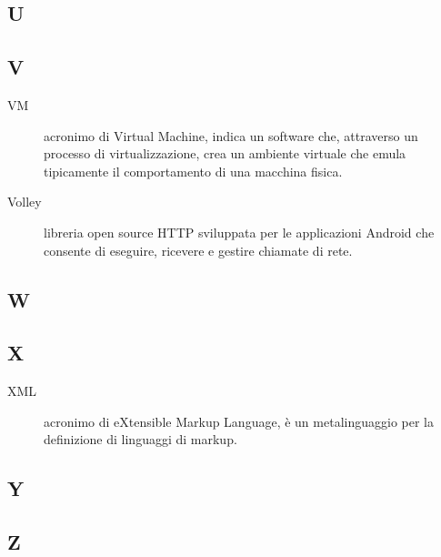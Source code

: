 \documentclass[../manuale-manutentore.tex]{subfiles}
\begin{document}
\subsection{U}

\subsection{V}

\begin{description}
    \item[VM] acronimo di Virtual Machine, indica un software che, attraverso un processo di virtualizzazione, crea un ambiente virtuale che emula tipicamente il comportamento di una macchina fisica.
    \item[Volley] libreria open source HTTP sviluppata per le applicazioni Android che consente di eseguire, ricevere e gestire chiamate di rete.
\end{description}

\subsection{W}

\subsection{X}
\begin{description}
    \item[XML] acronimo di eXtensible Markup Language, è un metalinguaggio per la definizione di linguaggi di markup.
\end{description}

\subsection{Y}

\subsection{Z}
\end{document}
